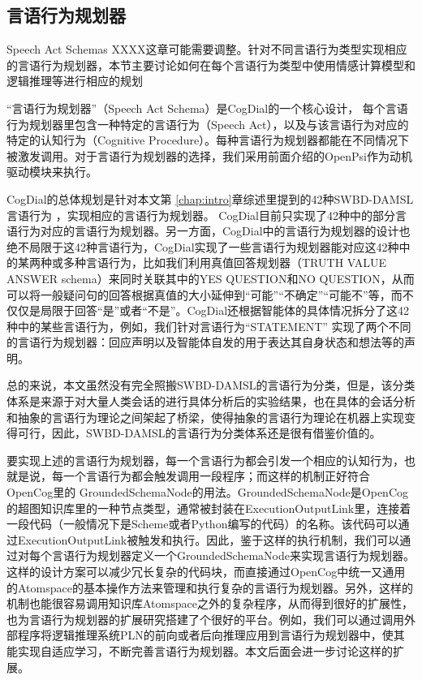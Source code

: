 \subsection{言语行为规划器}{Speech Act Schemas}
XXXX这章可能需要调整。针对不同言语行为类型实现相应的言语行为规划器，本节主要讨论如何在每个言语行为类型中使用情感计算模型和逻辑推理等进行相应的规划

“言语行为规划器”（Speech Act Schema）是CogDial的一个核心设计， 每个言语行为规划器里包含一种特定的言语行为（Speech Act），以及与该言语行为对应的特定的认知行为（Cognitive Procedure）。每种言语行为规划器都能在不同情况下被激发调用。对于言语行为规划器的选择，我们采用前面介绍的OpenPsi作为动机驱动模块来执行。

    CogDial的总体规划是针对本文第 \ref{chap:intro}章综述里提到的42种SWBD-DAMSL言语行为 \cite{Twitchell2004}，实现相应的言语行为规划器。 CogDial目前只实现了42种中的部分言语行为对应的言语行为规划器。另一方面，CogDial中的言语行为规划器的设计也绝不局限于这42种言语行为，CogDial实现了一些言语行为规划器能对应这42种中的某两种或多种言语行为，比如我们利用真值回答规划器（TRUTH VALUE ANSWER schema）来同时关联其中的YES QUESTION和NO QUESTION，从而可以将一般疑问句的回答根据真值的大小延伸到“可能”“不确定”“可能不”等，而不仅仅是局限于回答“是”或者“不是”。CogDial还根据智能体的具体情况拆分了这42种中的某些言语行为，例如，我们针对言语行为“STATEMENT” 实现了两个不同的言语行为规划器：回应声明以及智能体自发的用于表达其自身状态和想法等的声明。

总的来说，本文虽然没有完全照搬SWBD-DAMSL的言语行为分类，但是，该分类体系是来源于对大量人类会话的进行具体分析后的实验结果，也在具体的会话分析和抽象的言语行为理论之间架起了桥梁，使得抽象的言语行为理论在机器上实现变得可行，因此，SWBD-DAMSL的言语行为分类体系还是很有借鉴价值的。

要实现上述的言语行为规划器，每一个言语行为都会引发一个相应的认知行为，也就是说，每一个言语行为都会触发调用一段程序；而这样的机制正好符合OpenCog里的 GroundedSchemaNode的用法。GroundedSchemaNode是OpenCog的超图知识库里的一种节点类型，通常被封装在ExecutionOutputLink里，连接着一段代码（一般情况下是Scheme或者Python编写的代码）的名称。该代码可以通过ExecutionOutputLink被触发和执行。因此，鉴于这样的执行机制，我们可以通过对每个言语行为规划器定义一个GroundedSchemaNode来实现言语行为规划器。这样的设计方案可以减少冗长复杂的代码块，而直接通过OpenCog中统一又通用的Atomspace的基本操作方法来管理和执行复杂的言语行为规划器。另外，这样的机制也能很容易调用知识库Atomspace之外的复杂程序，从而得到很好的扩展性，也为言语行为规划器的扩展研究搭建了个很好的平台。例如，我们可以通过调用外部程序将逻辑推理系统PLN的前向或者后向推理应用到言语行为规划器中，使其能实现自适应学习，不断完善言语行为规划器。本文后面会进一步讨论这样的扩展。

